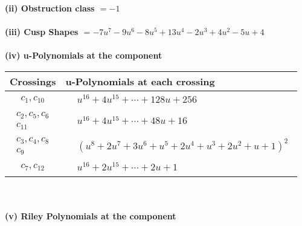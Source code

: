 \documentclass[1p]{elsarticle_modified}
\theoremstyle{definition}
\begin{document}
\flushleft \textbf{(ii) Obstruction class $= -1$}\\~\\
\flushleft \textbf{(iii) Cusp Shapes $= -7 u^7-9 u^6-8 u^5+13 u^4-2 u^3+4 u^2-5 u+4$}\\~\\
\newpage\renewcommand{\arraystretch}{1}
\flushleft \textbf{(iv) u-Polynomials at the component}\newline \\
\begin{tabular}{m{50pt}|m{274pt}}
Crossings & \hspace{64pt}u-Polynomials at each crossing \\
\hline $$\begin{aligned}c_{1},c_{10}\end{aligned}$$&$\begin{aligned}
&u^{16}+4 u^{15}+\cdots+128 u+256
\end{aligned}$\\
\hline $$\begin{aligned}c_{2},c_{5},c_{6}\\c_{11}\end{aligned}$$&$\begin{aligned}
&u^{16}+4 u^{15}+\cdots+48 u+16
\end{aligned}$\\
\hline $$\begin{aligned}c_{3},c_{4},c_{8}\\c_{9}\end{aligned}$$&$\begin{aligned}
&(u^8+2 u^7+3 u^6+u^5+2 u^4+u^3+2 u^2+u+1)^2
\end{aligned}$\\
\hline $$\begin{aligned}c_{7},c_{12}\end{aligned}$$&$\begin{aligned}
&u^{16}+2 u^{15}+\cdots+2 u+1
\end{aligned}$\\
\hline
\end{tabular}\\~\\
\newpage\renewcommand{\arraystretch}{1}
\flushleft \textbf{(v) Riley Polynomials at the component}\newline \\
\end{document}
